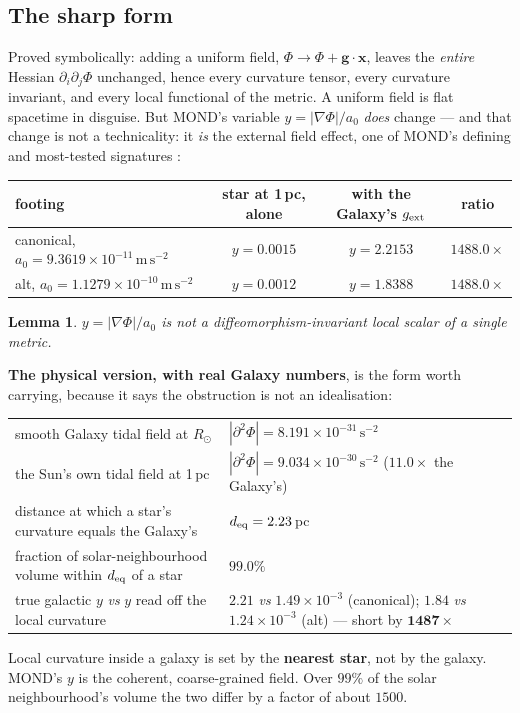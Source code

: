 \documentclass[11pt,letterpaper]{article}
\newtheorem{lemma}{Lemma}
\newcommand{\ms}{\,\mathrm{m\,s^{-2}}}
\begin{document}
\subsection{The sharp form}
Proved symbolically: adding a uniform field, $\Phi\to\Phi+\mathbf{g}\!\cdot\!\mathbf{x}$, leaves the \emph{entire} Hessian $\partial_i\partial_j\Phi$ unchanged, hence every curvature tensor, every curvature invariant, and every local functional of the metric. A uniform field is flat spacetime in disguise. But MOND's variable $y=|\nabla\Phi|/a_0$ \emph{does} change --- and that change is not a technicality: it \emph{is} the external field effect, one of MOND's defining and most-tested signatures \cite{FamaeyMcGaugh2012}:
\begin{center}\small
\begin{tabular}{lccc}\toprule
footing & star at 1\,pc, alone & with the Galaxy's $g_{\rm ext}$ & ratio\\\midrule
canonical, $a_0=9.3619\times10^{-11}\ms$ & $y=0.0015$ & $y=2.2153$ & $\mathbf{1488.0\times}$\\
alt, $a_0=1.1279\times10^{-10}\ms$ & $y=0.0012$ & $y=1.8388$ & $\mathbf{1488.0\times}$\\\bottomrule
\end{tabular}
\end{center}

\begin{lemma}\label{lem:one}
$y=|\nabla\Phi|/a_0$ is not a diffeomorphism-invariant local scalar of a single metric.
\end{lemma}

\textbf{The physical version, with real Galaxy numbers}, is the form worth carrying, because it says the obstruction is not an idealisation:
\begin{center}\small
\begin{tabular}{L{0.56\textwidth}L{0.34\textwidth}}\toprule
smooth Galaxy tidal field at $R_\odot$ & $|\partial^2\Phi|=8.191\times10^{-31}\,\mathrm{s^{-2}}$\\
the Sun's own tidal field at 1\,pc & $|\partial^2\Phi|=9.034\times10^{-30}\,\mathrm{s^{-2}}$ ($11.0\times$ the Galaxy's)\\
distance at which a star's curvature equals the Galaxy's & $d_{\rm eq}=2.23$\,pc\\
fraction of solar-neighbourhood volume within $d_{\rm eq}$ of a star & $\mathbf{99.0\%}$\\
true galactic $y$ \emph{vs} $y$ read off the local curvature & $2.21$ \emph{vs} $1.49\times10^{-3}$ (canonical); $1.84$ \emph{vs} $1.24\times10^{-3}$ (alt) --- short by $\mathbf{1487\times}$\\\bottomrule
\end{tabular}
\end{center}
Local curvature inside a galaxy is set by the \textbf{nearest star}, not by the galaxy. MOND's $y$ is the coherent, coarse-grained field. Over $99\%$ of the solar neighbourhood's volume the two differ by a factor of about $1500$.
\end{document}
